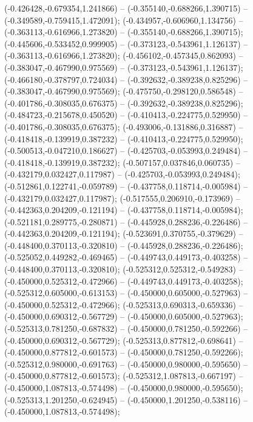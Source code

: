  (-0.426428,-0.679354,1.241866) -- (-0.355140,-0.688266,1.390715) -- (-0.349589,-0.759415,1.472091);
 (-0.434957,-0.606960,1.134756) -- (-0.363113,-0.616966,1.273820) -- (-0.355140,-0.688266,1.390715);
 (-0.445606,-0.533452,0.999905) -- (-0.373123,-0.543961,1.126137) -- (-0.363113,-0.616966,1.273820);
 (-0.456102,-0.457345,0.862093) -- (-0.383047,-0.467990,0.975569) -- (-0.373123,-0.543961,1.126137);
 (-0.466180,-0.378797,0.724034) -- (-0.392632,-0.389238,0.825296) -- (-0.383047,-0.467990,0.975569);
 (-0.475750,-0.298120,0.586548) -- (-0.401786,-0.308035,0.676375) -- (-0.392632,-0.389238,0.825296);
 (-0.484723,-0.215678,0.450520) -- (-0.410413,-0.224775,0.529950) -- (-0.401786,-0.308035,0.676375);
 (-0.493006,-0.131886,0.316887) -- (-0.418418,-0.139919,0.387232) -- (-0.410413,-0.224775,0.529950);
 (-0.500513,-0.047210,0.186627) -- (-0.425703,-0.053993,0.249484) -- (-0.418418,-0.139919,0.387232);
 (-0.507157,0.037846,0.060735) -- (-0.432179,0.032427,0.117987) -- (-0.425703,-0.053993,0.249484);
 (-0.512861,0.122741,-0.059789) -- (-0.437758,0.118714,-0.005984) -- (-0.432179,0.032427,0.117987);
 (-0.517555,0.206910,-0.173969) -- (-0.442363,0.204209,-0.121194) -- (-0.437758,0.118714,-0.005984);
 (-0.521181,0.289775,-0.280871) -- (-0.445928,0.288236,-0.226486) -- (-0.442363,0.204209,-0.121194);
 (-0.523691,0.370755,-0.379629) -- (-0.448400,0.370113,-0.320810) -- (-0.445928,0.288236,-0.226486);
 (-0.525052,0.449282,-0.469465) -- (-0.449743,0.449173,-0.403258) -- (-0.448400,0.370113,-0.320810);
 (-0.525312,0.525312,-0.549283) -- (-0.450000,0.525312,-0.472966) -- (-0.449743,0.449173,-0.403258);
 (-0.525312,0.605000,-0.613153) -- (-0.450000,0.605000,-0.527963) -- (-0.450000,0.525312,-0.472966);
 (-0.525313,0.690313,-0.659336) -- (-0.450000,0.690312,-0.567729) -- (-0.450000,0.605000,-0.527963);
 (-0.525313,0.781250,-0.687832) -- (-0.450000,0.781250,-0.592266) -- (-0.450000,0.690312,-0.567729);
 (-0.525313,0.877812,-0.698641) -- (-0.450000,0.877812,-0.601573) -- (-0.450000,0.781250,-0.592266);
 (-0.525312,0.980000,-0.691763) -- (-0.450000,0.980000,-0.595650) -- (-0.450000,0.877812,-0.601573);
 (-0.525312,1.087813,-0.667197) -- (-0.450000,1.087813,-0.574498) -- (-0.450000,0.980000,-0.595650);
 (-0.525313,1.201250,-0.624945) -- (-0.450000,1.201250,-0.538116) -- (-0.450000,1.087813,-0.574498);
